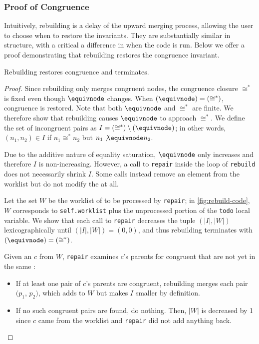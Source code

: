 \subsubsection{Proof of Congruence}

Intuitively, rebuilding is a delay of the upward merging process, allowing
  the user to choose when to restore the \egraph invariants.
They are substantially similar in structure, with a critical a difference in when
  the code is run.
Below we offer a proof demonstrating that rebuilding restores the
\egraph congruence invariant.

\begin{theorem}
  Rebuilding restores congruence and terminates.
\end{theorem}

\begin{proof}
  Since rebuilding only merges congruent nodes,
    the congruence closure $\cong^{*}$ is fixed even though $\equivnode$ changes.
  When $(\equivnode) = (\cong^*)$, congruence is restored.
  Note that both $\equivnode$ and $\cong^*$ are finite.
  We therefore show that rebuilding causes $\equivnode$ to approach $\cong^*$.
  We define the set of incongruent \enode pairs as $I = (\cong^*) \setminus (\equivnode)$;
  in other words,
    $(n_{1}, n_{2}) \in I$ if $n_{1} \cong^{*} n_{2}$
     but $n_{1} \not\equivnode n_{2}$.

  Due to the additive nature of equality saturation, $\equivnode$ only increases
    and therefore $I$ is non-increasing.
  However, a call to \texttt{repair} inside the loop of \texttt{rebuild} does
    not necessarily shrink $I$.
  Some calls instead remove an element from the worklist but do not modify the
    \egraph at all.

  Let the set $W$ be the worklist of \eclasses to be processed by
    \texttt{repair};
  in \autoref{fig:rebuild-code}, $W$ corresponds to \texttt{self.worklist} plus
    the unprocessed portion of the \texttt{todo} local variable.
  We show that each call to \texttt{repair} decreases the tuple
    $(|I|, |W|)$ lexicographically until $(|I|, |W|) = (0, 0)$,
    and thus rebuilding terminates with $(\equivnode) = (\cong^*)$.


  Given an \eclass $c$ from $W$, \texttt{repair} examines $c$'s parents
    for congruent \enodes that are not yet in the same \eclass:
  \begin{itemize}
    \item If at least one pair of $c$'s parents are congruent,
          rebuilding merges each pair $(p_{1}$, $p_{2})$,
          which adds to $W$ but makes $I$ smaller by definition.
    \item If no such congruent pairs are found, do nothing.
          Then, $|W|$ is decreased by 1 since $c$ came from the
          worklist and \texttt{repair} did not add anything back.
  \end{itemize}


\end{proof}
